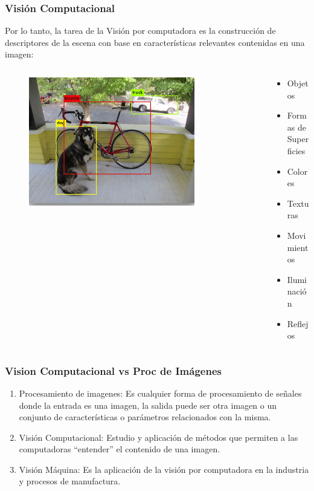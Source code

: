 \begin{frame}\frametitle{Visión Computacional}
  Por lo tanto, la tarea de la Visión por computadora es la construcción de descriptores de la escena con base en características relevantes contenidas en una imagen:
  \begin{columns}
    \begin{column}{0.5\textwidth}
\begin{figure}
    \centering
    \includegraphics[width=0.8\textwidth]{Figures/Yolo.png}
\end{figure}
    \end{column}
    \begin{column}{0.5\textwidth}
\begin{itemize}
\item Objetos
\item Formas de Superficies
\item Colores
\item Texturas
\item Movimientos
\item Iluminación
\item Reflejos
\end{itemize}
    \end{column}
    \end{columns}
\end{frame}

\begin{frame}\frametitle{Vision Computacional vs Proc de Imágenes}
\begin{enumerate}
\item Procesamiento de imagenes: Es cualquier forma de procesamiento de señales donde la entrada es una imagen, la salida puede ser otra imagen o un conjunto de características o parámetros relacionados con la misma.
\item Visión Computacional: Estudio y aplicación de métodos que permiten a las computadoras “entender” el contenido de una imagen.
\item Visión Máquina: Es la aplicación de la visión por computadora en la industria y procesos de manufactura.
\end{enumerate}

\end{frame}

